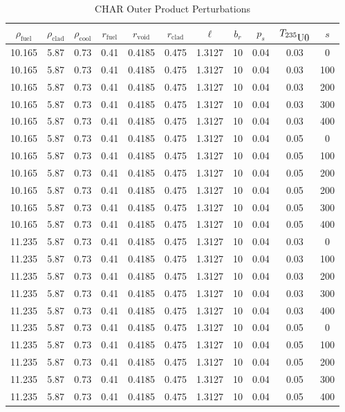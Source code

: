 \begin{table}[htbp]
\begin{center}
\caption{CHAR Outer Product Perturbations}
\label{char_param_outer_product}
\begin{tabular}{|ccccccccccc|}
\hline
\textbf{$\rho_{\mbox{fuel}}$} & \textbf{$\rho_{\mbox{clad}}$} & \textbf{$\rho_{\mbox{cool}}$} & \textbf{$r_{\mbox{fuel}}$} & \textbf{$r_{\mbox{void}}$} & \textbf{$r_{\mbox{clad}}$} & \textbf{$\ell$} & \textbf{$b_r$} & \textbf{$p_s$} & \textbf{$T_{\mbox{\nuc{U}{235}0}}$} & \textbf{$s$} \\
\hline
10.165 & 5.87 & 0.73 & 0.41 & 0.4185 & 0.475 & 1.3127 & 10 & 0.04 & 0.03 & 0   \\ 
10.165 & 5.87 & 0.73 & 0.41 & 0.4185 & 0.475 & 1.3127 & 10 & 0.04 & 0.03 & 100 \\ 
10.165 & 5.87 & 0.73 & 0.41 & 0.4185 & 0.475 & 1.3127 & 10 & 0.04 & 0.03 & 200 \\ 
10.165 & 5.87 & 0.73 & 0.41 & 0.4185 & 0.475 & 1.3127 & 10 & 0.04 & 0.03 & 300 \\ 
10.165 & 5.87 & 0.73 & 0.41 & 0.4185 & 0.475 & 1.3127 & 10 & 0.04 & 0.03 & 400 \\ 
10.165 & 5.87 & 0.73 & 0.41 & 0.4185 & 0.475 & 1.3127 & 10 & 0.04 & 0.05 & 0   \\ 
10.165 & 5.87 & 0.73 & 0.41 & 0.4185 & 0.475 & 1.3127 & 10 & 0.04 & 0.05 & 100 \\ 
10.165 & 5.87 & 0.73 & 0.41 & 0.4185 & 0.475 & 1.3127 & 10 & 0.04 & 0.05 & 200 \\ 
10.165 & 5.87 & 0.73 & 0.41 & 0.4185 & 0.475 & 1.3127 & 10 & 0.04 & 0.05 & 200 \\ 
10.165 & 5.87 & 0.73 & 0.41 & 0.4185 & 0.475 & 1.3127 & 10 & 0.04 & 0.05 & 300 \\ 
10.165 & 5.87 & 0.73 & 0.41 & 0.4185 & 0.475 & 1.3127 & 10 & 0.04 & 0.05 & 400 \\ 
11.235 & 5.87 & 0.73 & 0.41 & 0.4185 & 0.475 & 1.3127 & 10 & 0.04 & 0.03 & 0   \\ 
11.235 & 5.87 & 0.73 & 0.41 & 0.4185 & 0.475 & 1.3127 & 10 & 0.04 & 0.03 & 100 \\ 
11.235 & 5.87 & 0.73 & 0.41 & 0.4185 & 0.475 & 1.3127 & 10 & 0.04 & 0.03 & 200 \\ 
11.235 & 5.87 & 0.73 & 0.41 & 0.4185 & 0.475 & 1.3127 & 10 & 0.04 & 0.03 & 300 \\ 
11.235 & 5.87 & 0.73 & 0.41 & 0.4185 & 0.475 & 1.3127 & 10 & 0.04 & 0.03 & 400 \\ 
11.235 & 5.87 & 0.73 & 0.41 & 0.4185 & 0.475 & 1.3127 & 10 & 0.04 & 0.05 & 0   \\ 
11.235 & 5.87 & 0.73 & 0.41 & 0.4185 & 0.475 & 1.3127 & 10 & 0.04 & 0.05 & 100 \\ 
11.235 & 5.87 & 0.73 & 0.41 & 0.4185 & 0.475 & 1.3127 & 10 & 0.04 & 0.05 & 200 \\ 
11.235 & 5.87 & 0.73 & 0.41 & 0.4185 & 0.475 & 1.3127 & 10 & 0.04 & 0.05 & 300 \\ 
11.235 & 5.87 & 0.73 & 0.41 & 0.4185 & 0.475 & 1.3127 & 10 & 0.04 & 0.05 & 400 \\ 
\hline
\end{tabular}
\end{center}
\end{table}

